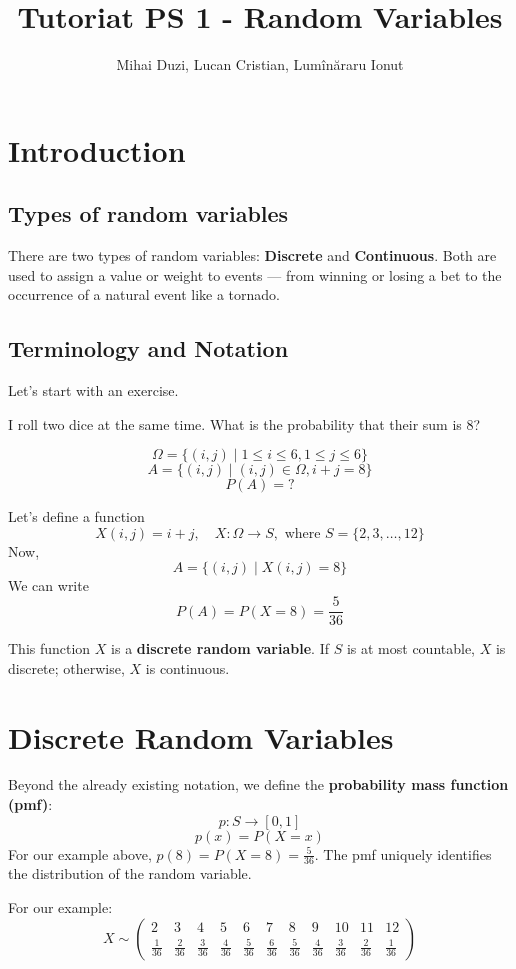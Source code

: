 \documentclass[12pt]{article}
\title{Tutoriat PS 1 - Random Variables}
\author{Mihai Duzi, Lucan Cristian, Lumînăraru Ionut}
\date{}
\begin{document}
\maketitle
\tableofcontents
\newpage

\section{Introduction}

\subsection{Types of random variables}

There are two types of random variables: \textbf{Discrete} and \textbf{Continuous}.  
Both are used to assign a value or weight to events — from winning or losing a bet to the occurrence of a natural event like a tornado.

\subsection{Terminology and Notation}

Let's start with an exercise.

I roll two dice at the same time. What is the probability that their sum is 8?

\[
\Omega = \{(i, j) \mid 1 \leq i \leq 6, 1 \leq j \leq 6\}
\]
\[
A = \{(i, j) \mid (i, j) \in \Omega, i + j = 8\}
\]
\[
P(A) = ?
\]

Let's define a function
\[
X(i, j) = i + j, \quad X: \Omega \rightarrow S, \text{ where } S = \{2, 3, \dots, 12\}
\]
Now,
\[
A = \{(i, j) \mid X(i,j) = 8\}
\]
We can write
\[
P(A) = P(X = 8) = \frac{5}{36}
\]

This function \( X \) is a \textbf{discrete random variable}.  
If \( S \) is at most countable, \( X \) is discrete; otherwise, \( X \) is continuous.

\section{Discrete Random Variables}

Beyond the already existing notation, we define the \textbf{probability mass function (pmf)}:
\[
p : S \rightarrow [0, 1]
\]
\[
p(x) = P(X = x)
\]
For our example above, \( p(8) = P(X = 8) = \frac{5}{36} \).  
The pmf uniquely identifies the distribution of the random variable.

For our example:
\[
X \sim 
\left(
\begin{array}{ccccccccccc}
2 & 3 & 4 & 5 & 6 & 7 & 8 & 9 & 10 & 11 & 12 \\[4pt]
\frac{1}{36} & \frac{2}{36} & \frac{3}{36} & \frac{4}{36} & \frac{5}{36} & \frac{6}{36} & \frac{5}{36} & \frac{4}{36} & \frac{3}{36} & \frac{2}{36} & \frac{1}{36}
\end{array}
\right)
\]
\end{document}
